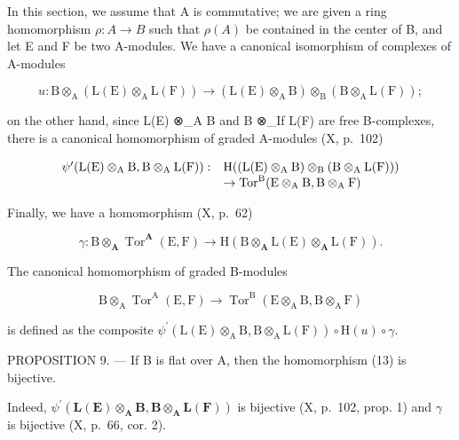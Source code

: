 In this section, we assume that A is commutative; we are given a ring homomorphism \(\rho: A \to B\) such that \(\rho(A)\) be contained in the center of B, and let E and F be two A-modules. We have a canonical isomorphism of complexes of A-modules

\[
u: \mathrm{B} \otimes_ {\mathrm{A}} (\mathrm{L} (\mathrm{E}) \otimes_ {\mathrm{A}} \mathrm{L} (\mathrm{F})) \rightarrow (\mathrm{L} (\mathrm{E}) \otimes_ {\mathrm{A}} \mathrm{B}) \otimes_ {\mathrm{B}} (\mathrm{B} \otimes_ {\mathrm{A}} \mathrm{L} (\mathrm{F}));
\]

on the other hand, since L(E) ⊗\_A B and B ⊗\_If L(F) are free B-complexes, there is a canonical homomorphism of graded A-modules (X, p.~102)

\[
\begin{array}{r l} \psi^ {\prime} (\mathrm{L(E)} \otimes_ {\mathrm{A}} \mathrm{B}, \mathrm{B} \otimes_ {\mathrm{A}} \mathrm{L(F)}): & \mathrm{H} ((\mathrm{L(E)} \otimes_ {\mathrm{A}} \mathrm{B}) \otimes_ {\mathrm{B}} (\mathrm{B} \otimes_ {\mathrm{A}} \mathrm{L(F)})) \\ & \to \operatorname{Tor} ^ {\mathrm{B}} (\mathrm{E} \otimes_ {\mathrm{A}} \mathrm{B}, \mathrm{B} \otimes_ {\mathrm{A}} \mathrm{F}) \end{array}
\]

Finally, we have a homomorphism (X, p.~62)

\[
\gamma : \mathrm{B} \otimes_ {\mathbf {A}} \operatorname{Tor} ^ {\mathbf {A}} (\mathrm{E}, \mathrm{F}) \rightarrow \mathrm{H} (\mathrm{B} \otimes_ {\mathbf {A}} \mathrm{L} (\mathrm{E}) \otimes_ {\mathbf {A}} \mathrm{L} (\mathrm{F})) .
\]

The canonical homomorphism of graded B-modules

\[
\mathrm{B} \otimes_ {\mathrm{A}} \operatorname{Tor} ^ {\mathrm{A}} (\mathrm{E}, \mathrm{F}) \rightarrow \operatorname{Tor} ^ {\mathrm{B}} (\mathrm{E} \otimes_ {\mathrm{A}} \mathrm{B}, \mathrm{B} \otimes_ {\mathrm{A}} \mathrm{F})\tag{13}
\]

is defined as the composite \(\psi^{\prime}(\mathrm{L}(\mathrm{E})\otimes_{\mathrm{A}}\mathrm{B},\mathrm{B}\otimes_{\mathrm{A}}\mathrm{L}(\mathrm{F}))\circ \mathrm{H}(u)\circ \gamma .\)

PROPOSITION 9. --- If B is flat over A, then the homomorphism (13) is bijective.

Indeed, \(\psi^{\prime}(\mathbf{L}(\mathbf{E})\otimes_{\mathbf{A}}\mathbf{B},\mathbf{B}\otimes_{\mathbf{A}}\mathbf{L}(\mathbf{F}))\) is bijective (X, p.~102, prop. 1) and \(\gamma\) is bijective (X, p.~66, cor. 2).

